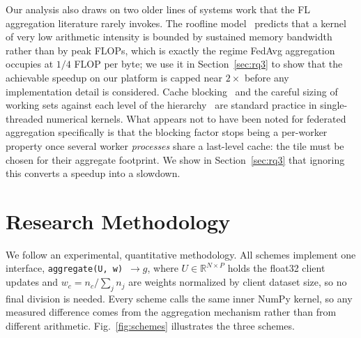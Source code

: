 \documentclass[conference]{IEEEtran}
\begin{document}
Our analysis also draws on two older lines of systems work that the FL aggregation literature rarely invokes. The roofline model~\cite{roofline} predicts that a kernel of very low arithmetic intensity is bounded by sustained memory bandwidth~\cite{stream} rather than by peak FLOPs, which is exactly the regime FedAvg aggregation occupies at $1/4$ FLOP per byte; we use it in Section~\ref{sec:rq3} to show that the achievable speedup on our platform is capped near $2\times$ before any implementation detail is considered. Cache blocking~\cite{lam1991} and the careful sizing of working sets against each level of the hierarchy~\cite{goto2008} are standard practice in single-threaded numerical kernels. What appears not to have been noted for federated aggregation specifically is that the blocking factor stops being a per-worker property once several worker \emph{processes} share a last-level cache: the tile must be chosen for their aggregate footprint. We show in Section~\ref{sec:rq3} that ignoring this converts a speedup into a slowdown.

\begin{table}[t]
\caption{Summary of Reviewed Studies}
\label{tab:related}
\centering
\footnotesize
\setlength{\tabcolsep}{3pt}
\end{table}

\section{Research Methodology}
\label{sec:method}
We follow an experimental, quantitative methodology. All schemes implement one interface, \texttt{aggregate(U, w)}~$\rightarrow g$, where $U\in\mathbb{R}^{N\times P}$ holds the float32 client updates and $w_c=n_c/\sum_j n_j$ are weights normalized by client dataset size, so no final division is needed. Every scheme calls the same inner NumPy kernel, so any measured difference comes from the aggregation mechanism rather than from different arithmetic. Fig.~\ref{fig:schemes} illustrates the three schemes.
\end{document}
